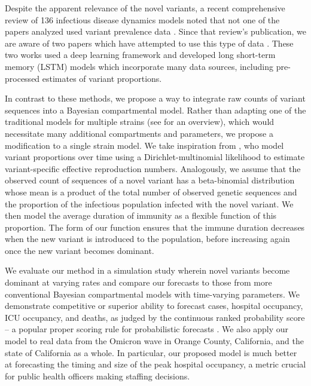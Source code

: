 Despite the apparent relevance of the novel variants, a recent comprehensive review of 136 infectious disease dynamics models noted that not one of the papers analyzed used variant prevalence data \citep{Nixon2022evaluation}.
Since that review's publication, we are aware of two papers which have attempted to use this type of data \citep{Du2023Incorporating, Rashed2022Covid}.
These two works used a deep learning framework and developed long short-term memory (LSTM) models which incorporate many data sources, including pre-processed estimates of variant proportions.

In contrast to these methods, we propose a way to integrate raw counts of variant sequences into a Bayesian compartmental model.
Rather than adapting one of the traditional models for multiple strains (see \citet{Kucharski2016Capturing} for an overview), which would necessitate many additional compartments and parameters, we propose a modification to a single strain model.
We take inspiration from \citet{Figgins2021variant}, who model variant proportions over time using a Dirichlet-multinomial likelihood to estimate variant-specific effective reproduction numbers.
Analogously, we assume that the observed count of sequences of a novel variant has a beta-binomial distribution whose mean is a product of the total number of observed genetic sequences and the proportion of the infectious population infected with the novel variant.
We then model the average duration of immunity as a flexible function of this proportion.
The form of our function ensures that the immune duration decreases when the new variant is introduced to the population, before increasing again once the new variant becomes dominant.

We evaluate our method in a simulation study wherein novel variants become dominant at varying rates and compare our forecasts to those from more conventional Bayesian compartmental models with time-varying parameters.
We demonstrate competitive or superior ability to forecast cases, hospital occupancy, ICU occupancy, and deaths, as judged by the continuous ranked probability score -- a popular proper scoring rule for probabilistic forecasts \citep{gneiting2007strictly}.
We also apply our model to real data from the Omicron wave in Orange County, California, and the state of California as a whole.
In particular, our proposed model is much better at forecasting the timing and size of the peak hospital occupancy, a metric crucial for public health officers making staffing decisions.


